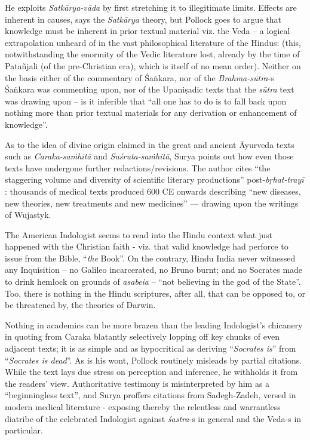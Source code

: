 He exploits {\sl Satkārya-vāda} by first stretching it to illegitimate limits. Effects are inherent in causes, says the {\sl Satkārya} theory, but Pollock goes to argue that knowledge must be inherent in prior textual material viz. the Veda -- a logical extrapolation unheard of in the vast philosophical literature of the Hindus: (this, notwithstanding the enormity of the Vedic literature lost, already by the time of Patañjali (of the pre-Christian era), which is itself of no mean order). Neither on the basis either of the commentary of Śaṅkara, nor of the \hbox{{\sl Brahma-sūtra}-s} Śaṅkara was commenting upon, nor of the Upaniṣadic texts that the {\sl sūtra} text was drawing upon -- is it inferible that “all one has to do is to fall back upon nothing more than prior textual materials for any derivation or enhancement of knowledge”.
\vskip 3pt

As to the idea of divine origin claimed in the great and ancient Āyurveda texts such as {\sl Caraka-saṁhitā} and {\sl Suśruta-saṁhitā}, Surya points out how even those texts have undergone further redactions/revisions. The author cites “the staggering volume and diversity of scientific literary productions” post-{\sl bṛhat-trayī} : thousands of medical texts produced 600 CE onwards describing “new diseases, new theories, new treatments and new medicines” --- drawing upon the writings of Wujastyk.
\vskip 3pt

The American Indologist seems to read into the Hindu context what just happened with the Christian faith - viz. that valid knowledge had perforce to issue from the Bible, “{\sl the} Book”. On the contrary, Hindu India never witnessed any Inquisition -- no Galileo incarcerated, no Bruno burnt; and no Socrates made to drink hemlock on grounds of {\sl asabeia} -- “not believing in the god of the State”. Too, there is nothing in the Hindu scriptures, after all, that can be opposed to, or be threatened by, the theories of Darwin.

Nothing in academics can be more brazen than the leading Indologist’s chicanery in quoting from Caraka blatantly selectively lopping off key chunks of even adjacent texts; it is as simple and as hypocritical as deriving “{\sl Socrates is}” from “{\sl Socrates is dead}”. As is his wont, Pollock routinely misleads by partial citations. While the text lays due stress on perception and inference, he withholds it from the readers’ view. Authoritative testimony is misinterpreted by him as a “beginningless text”, and Surya proffers citations from Sadegh-Zadeh, versed in modern medical literature - exposing thereby the relentless and warrantless diatribe of the celebrated Indologist against {\sl śastra}-s in general and the Veda-s in particular.
\vskip 8pt

